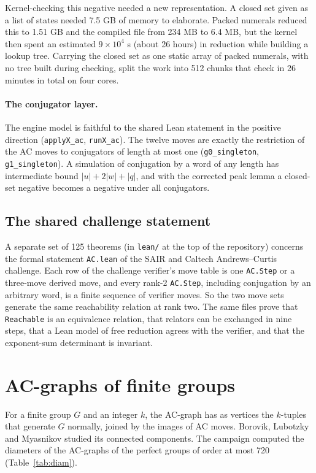 \documentclass[11pt,a4paper]{article}
\theoremstyle{definition}
\begin{document}
Kernel-checking this negative needed a new representation. A closed set given as a list of states needed 7.5 GB of memory to elaborate. Packed numerals reduced this to 1.51 GB and the compiled file from 234 MB to 6.4 MB, but the kernel then spent an estimated $9\times10^4$ s (about 26 hours) in reduction while building a lookup tree. Carrying the closed set as one static array of packed numerals, with no tree built during checking, split the work into 512 chunks that check in 26 minutes in total on four cores.

\paragraph{The conjugator layer.} The engine model is faithful to the shared Lean statement in the positive direction (\texttt{applyX\_ac}, \texttt{runX\_ac}). The twelve moves are exactly the restriction of the AC moves to conjugators of length at most one (\texttt{g0\_singleton}, \texttt{g1\_singleton}). A simulation of conjugation by a word of any length has intermediate bound $|u|+2|w|+|q|$, and with the corrected peak lemma a closed-set negative becomes a negative under all conjugators.

\subsection{The shared challenge statement}

A separate set of 125 theorems (in \texttt{lean/} at the top of the repository) concerns the formal statement \texttt{AC.lean} of the SAIR and Caltech Andrews--Curtis challenge. Each row of the challenge verifier's move table is one \texttt{AC.Step} or a three-move derived move, and every rank-2 \texttt{AC.Step}, including conjugation by an arbitrary word, is a finite sequence of verifier moves. So the two move sets generate the same reachability relation at rank two. The same files prove that \texttt{Reachable} is an equivalence relation, that relators can be exchanged in nine steps, that a Lean model of free reduction agrees with the verifier, and that the exponent-sum determinant is invariant.

\section{AC-graphs of finite groups}\label{sec:finite}

For a finite group $G$ and an integer $k$, the AC-graph has as vertices the $k$-tuples that generate $G$ normally, joined by the images of AC moves. Borovik, Lubotzky and Myasnikov \cite{BLM05} studied its connected components. The campaign computed the diameters of the AC-graphs of the perfect groups of order at most 720 (Table~\ref{tab:diam}).
\end{document}
